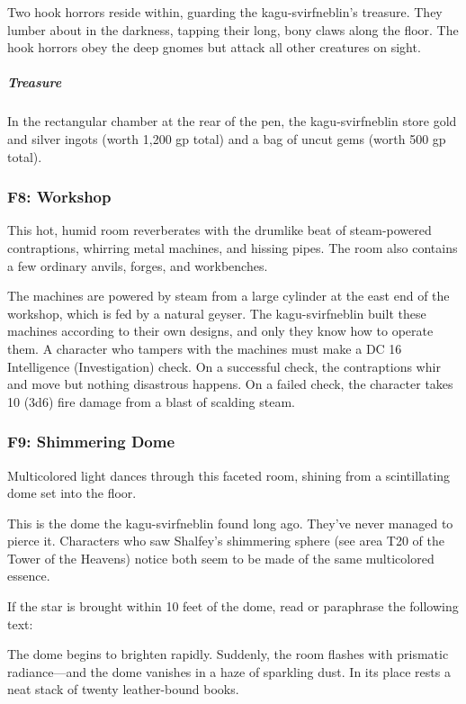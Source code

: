 \documentclass[10pt,a4paper,twoside,bg=print,twocolumn,openany,nodeprecatedcode]{dndbook}
\begin{document}
Two hook horrors reside within, guarding the kagu-svirfneblin's treasure. They lumber about in the darkness, tapping their long, bony claws along the floor. The hook horrors obey the deep gnomes but attack all other creatures on sight.

\subparagraph{Treasure}
In the rectangular chamber at the rear of the pen, the kagu-svirfneblin store gold and silver ingots (worth 1,200 gp total) and a bag of uncut gems (worth 500 gp total).

\subsubsection{F8: Workshop}
\begin{DndReadAloud}{}
This hot, humid room reverberates with the drumlike beat of steam-powered contraptions, whirring metal machines, and hissing pipes. The room also contains a few ordinary anvils, forges, and workbenches.

\end{DndReadAloud}

The machines are powered by steam from a large cylinder at the east end of the workshop, which is fed by a natural geyser. The kagu-svirfneblin built these machines according to their own designs, and only they know how to operate them. A character who tampers with the machines must make a DC 16 Intelligence (Investigation) check. On a successful check, the contraptions whir and move but nothing disastrous happens. On a failed check, the character takes 10 (3d6) fire damage from a blast of scalding steam.

\subsubsection{F9: Shimmering Dome}
\begin{DndReadAloud}{}
Multicolored light dances through this faceted room, shining from a scintillating dome set into the floor.

\end{DndReadAloud}

This is the dome the kagu-svirfneblin found long ago. They've never managed to pierce it. Characters who saw Shalfey's shimmering sphere (see area T20 of the Tower of the Heavens) notice both seem to be made of the same multicolored essence.

If the star is brought within 10 feet of the dome, read or paraphrase the following text:

\begin{DndReadAloud}{}
The dome begins to brighten rapidly. Suddenly, the room flashes with prismatic radiance—and the dome vanishes in a haze of sparkling dust. In its place rests a neat stack of twenty leather-bound books.

\end{DndReadAloud}
\end{document}

